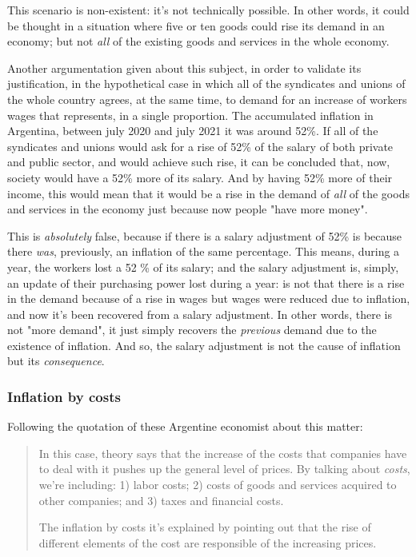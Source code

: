 \documentclass[12pt,a4paper,twoside]{book}
\begin{document}
This scenario is non-existent: it's not technically possible. In other words, it could be thought in a situation where five or ten goods could rise its demand in an economy; but not \textit{all} of the existing goods and services in the whole economy.

Another argumentation given about this subject, in order to validate its justification, in the hypothetical case in which all of the syndicates and unions of the whole country agrees, at the same time, to demand for an increase of workers wages that represents, in a single proportion. The accumulated inflation in Argentina, between july 2020 and july 2021 it was around 52\%. If all of the syndicates and unions would ask for a rise of 52\% of the salary of both private and public sector, and would achieve such rise, it can be concluded that, now, society would have a 52\% more of its salary. And by having 52\% more of their income, this would mean that it would be a rise in the demand of \textit{all} of the goods and services in the economy just because now people "have more money".

This is \textit{absolutely} false, because if there is a salary adjustment of 52\% is because there \textit{was}, previously, an inflation of the same percentage. This means, during a year, the workers lost a 52 \% of its salary; and the salary adjustment is, simply, an update of their purchasing power lost during a year: is not that there is a rise in the demand because of a rise in wages but wages were reduced due to inflation, and now it's been recovered from a salary adjustment. In other words, there is not "more demand", it just simply recovers the \textit{previous} demand due to the existence of inflation. And so, the salary adjustment is not the cause of inflation but its \textit{consequence}.

\subsubsection{Inflation by costs}
Following the quotation of these Argentine economist about this matter:

\begin{quotation}
In this case, theory says that the increase of the costs that companies have to deal with it pushes up the general level of prices. By talking about \textit{costs}, we're including: 1) labor costs; 2) costs of goods and services acquired to other companies; and 3) taxes and financial costs.

The inflation by costs it's explained by pointing out that the rise of different elements of the cost are responsible of the increasing prices. \cite[p. 466]{elementos-econopol}
\end{quotation}
\end{document}
